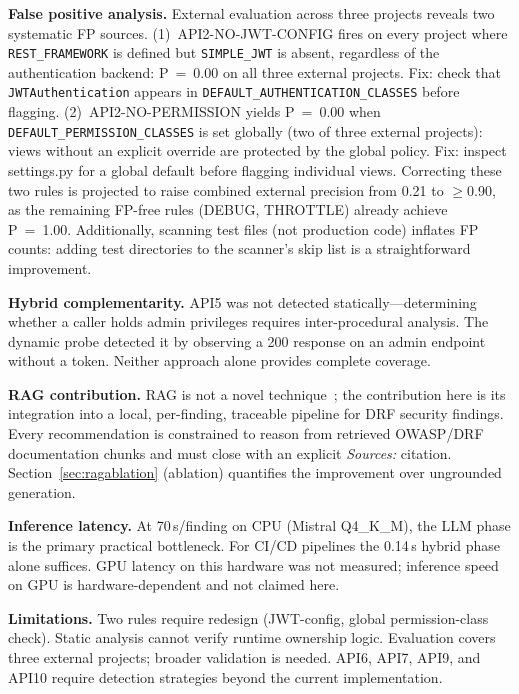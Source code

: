 \documentclass[conference]{IEEEtran}
\begin{document}
\textbf{False positive analysis.} External evaluation across three projects
reveals two systematic FP sources.
(1)~API2-NO-JWT-CONFIG fires on every project where \texttt{REST\_FRAMEWORK}
is defined but \texttt{SIMPLE\_JWT} is absent, regardless of the
authentication backend: P~=~0.00 on all three external projects. Fix: check
that \texttt{JWTAuthentication} appears in \texttt{DEFAULT\_AUTHENTICATION\_CLASSES}
before flagging.
(2)~API2-NO-PERMISSION yields P~=~0.00 when \texttt{DEFAULT\_PERMISSION\_CLASSES}
is set globally (two of three external projects): views without an explicit
override are protected by the global policy. Fix: inspect settings.py for a
global default before flagging individual views.
Correcting these two rules is projected to raise combined external precision
from 0.21 to $\geq$0.90, as the remaining FP-free rules (DEBUG, THROTTLE)
already achieve P~=~1.00. Additionally, scanning test files (not production
code) inflates FP counts: adding test directories to the scanner's skip list
is a straightforward improvement.

\textbf{Hybrid complementarity.} API5 was not detected statically—determining
whether a caller holds admin privileges requires inter-procedural analysis.
The dynamic probe detected it by observing a 200 response on an admin endpoint
without a token. Neither approach alone provides complete coverage.

\textbf{RAG contribution.} RAG is not a novel technique~\cite{rag2020}; the
contribution here is its integration into a local, per-finding, traceable
pipeline for DRF security findings. Every recommendation is constrained to
reason from retrieved OWASP/DRF documentation chunks and must close with an
explicit \textit{Sources:} citation. Section~\ref{sec:ragablation} (ablation)
quantifies the improvement over ungrounded generation.

\textbf{Inference latency.} At 70\,s/finding on CPU (Mistral Q4\_K\_M), the
LLM phase is the primary practical bottleneck. For CI/CD pipelines the
0.14\,s hybrid phase alone suffices. GPU latency on this hardware was not
measured; inference speed on GPU is hardware-dependent and not claimed here.

\textbf{Limitations.} Two rules require redesign (JWT-config, global
permission-class check). Static analysis cannot verify runtime ownership
logic. Evaluation covers three external projects; broader validation is needed.
API6, API7, API9, and API10 require detection strategies beyond the current
implementation.
\end{document}
